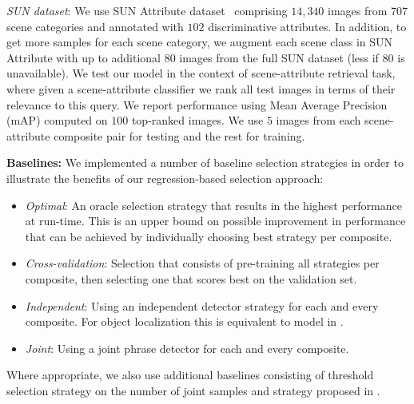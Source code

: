 \documentclass[runningheads]{llncs}
\begin{document}
{\em SUN dataset}: We use SUN Attribute dataset~\cite{patterson2014sun} comprising $14,340$ images from $707$ scene categories and annotated with $102$ discriminative attributes. In addition, to get more samples for each scene category, we augment each scene class in SUN Attribute with up to additional $80$ images from the full SUN dataset (less if $80$ is unavailable). 
We test our model in the context of scene-attribute retrieval task, where given a scene-attribute classifier we rank all test images in terms of their relevance to this query. We report performance using Mean Average Precision (mAP) computed on $100$ top-ranked images. We use $5$ images from each scene-attribute composite pair for testing and the rest for training. 


\vspace{0.1in}
\noindent
{\bf Baselines:} 
We implemented a number of baseline selection strategies in order to illustrate the benefits of our regression-based selection approach:

\vspace{-0.05in}
\begin{itemize}
\item {\em Optimal}: An oracle selection strategy that results in the highest performance at run-time. This is an upper bound on possible improvement in performance that can be achieved by individually choosing best strategy per composite.
\vspace{0.05in}
\item {\em Cross-validation}: Selection that consists of pre-training all strategies per composite, then selecting one that scores best on the validation set.
\vspace{0.05in}
\item {\em Independent}: Using an independent detector strategy for each and every composite. For object localization this is equivalent to model in \cite{Johnson2015}. 
\vspace{0.05in}
\item {\em Joint}: Using a joint phrase \cite{Sadeghi2011} detector for each and every composite. 
\end{itemize}
\vspace{-0.05in}

Where appropriate, we also use additional baselines consisting of threshold selection strategy on the number of joint samples and strategy proposed in \cite{Rastegari2013}.
\end{document}
